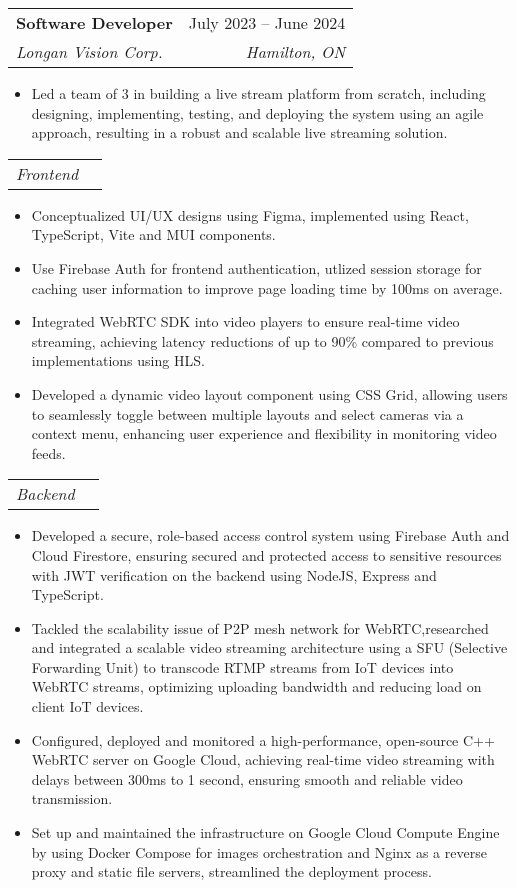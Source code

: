 \documentclass[letterpaper,11pt]{article}
\makeatletter
\newcommand{\resumeItem}[1]{
  \item\small{
    {#1 \vspace{-2pt}}
  }
}
\newcommand{\resumeSubheading}[4]{
  \vspace{-2pt}\item
    \begin{tabular*}{0.97\textwidth}[t]{l@{\extracolsep{\fill}}r}
      \textbf{#1} & #2 \\
      \textit{\small#3} & \textit{\small #4} \\
    \end{tabular*}\vspace{-7pt}
}
\newcommand{\resumeSubSubheading}[2]{
    \item
    \begin{tabular*}{0.97\textwidth}{l@{\extracolsep{\fill}}r}
      \textit{\small#1} & \textit{\small #2} \\
    \end{tabular*}\vspace{-7pt}
}
\newcommand{\resumeSubItem}[1]{
  \begin{itemize}[leftmargin=0.2in, label=\textbullet]
    \item\small{
      {#1 \vspace{-2pt}}
    }
  \end{itemize}
}
\newcommand{\resumeItemListStart}{\begin{itemize}}
\newcommand{\resumeItemListEnd}{\end{itemize}\vspace{-5pt}}
\makeatother
\begin{document}
    \resumeSubheading
      {Software Developer}{July 2023 -- June 2024}
      {Longan Vision Corp.}{Hamilton, ON}
        \resumeItemListStart
          \resumeItem{Led a team of 3 in building a live stream platform from scratch, including designing, implementing, testing, and deploying the system using an agile approach, resulting in a robust and scalable live streaming solution.}
        \resumeItemListEnd
      \resumeSubSubheading{Frontend}{}
        \resumeItemListStart
          \resumeItem{Conceptualized UI/UX designs using Figma, implemented using React,  TypeScript, Vite and MUI components.}
          \resumeItem{Use Firebase Auth for frontend authentication, utlized session storage for caching user information to improve page loading time by 100ms on average.}
          \resumeItem{Integrated WebRTC SDK into video players to ensure real-time video streaming, achieving latency reductions of up to 90\% compared to previous implementations using HLS.}
          \resumeItem{Developed a dynamic video layout component using CSS Grid, allowing users to   seamlessly toggle between multiple layouts and select cameras via a context menu, enhancing user experience and flexibility in monitoring video feeds.}
        \resumeItemListEnd
      \resumeSubSubheading{Backend}{}
      \resumeItemListStart
          \resumeItem{Developed a secure, role-based access control system using Firebase Auth and Cloud Firestore, ensuring secured and protected access to sensitive resources with JWT verification on the backend using NodeJS, Express and TypeScript.}
          \resumeItem{Tackled the scalability issue of P2P mesh network for WebRTC,researched and integrated a scalable video streaming architecture using a SFU (Selective Forwarding Unit) to transcode RTMP streams from IoT devices into WebRTC streams, optimizing uploading bandwidth and reducing load on client IoT devices.}
          \resumeItem{Configured, deployed and monitored a high-performance, open-source C++ WebRTC server on Google Cloud, achieving real-time video streaming with delays between 300ms to 1 second, ensuring smooth and reliable video transmission.}
          \resumeItem{Set up and maintained the infrastructure on Google Cloud Compute Engine by using Docker Compose for images orchestration and Nginx as a reverse proxy and static file servers, streamlined the deployment process.}
        \resumeItemListEnd
  
\end{document}
